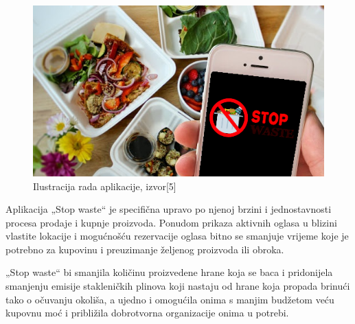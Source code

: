 	\begin{figure}[H]
		\includegraphics[scale=0.6]{slike/StopWaste.PNG} %
		\centering
		\caption{Ilustracija rada aplikacije, izvor[5]}
		\label{fig:StopWaste}
	\end{figure}
	
Aplikacija „Stop waste“ je specifična upravo po njenoj brzini i jednostavnosti procesa prodaje i kupnje proizvoda. Ponudom prikaza aktivnih oglasa u blizini vlastite lokacije i mogućnošću  rezervacije oglasa bitno se smanjuje vrijeme koje je potrebno za kupovinu i preuzimanje željenog proizvoda ili obroka. 

„Stop waste“ bi smanjila količinu proizvedene hrane koja se baca i pridonijela smanjenju emisije stakleničkih plinova koji nastaju od hrane koja propada brinući tako o očuvanju okoliša, a ujedno i omogućila onima s manjim budžetom veću kupovnu moć i približila dobrotvorna organizacije onima u potrebi. 
		
		\eject
